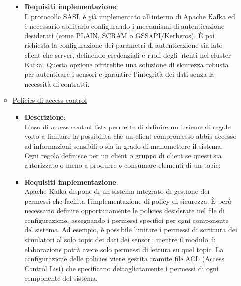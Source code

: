\documentclass[10pt]{article}
\begin{document}
\begin{itemize}
\begin{itemize}
\begin{itemize}
                    \item \textbf{Requisiti implementazione}:\\
                    Il protocollo SASL è già implementato all'interno di Apache Kafka ed è necessario abilitarlo configurando i meccanismi di autenticazione desiderati (come PLAIN, SCRAM o GSSAPI/Kerberos).
                    È poi richiesta la configurazione dei parametri di autenticazione sia lato client che server, definendo credenziali e ruoli degli utenti nel cluster Kafka.
                    Questa opzione offrirebbe una soluzione di sicurezza robusta per autenticare i sensori e garantire l'integrità dei dati senza la necessità di contratti.

                \end{itemize}

                \item \underline{Policies di access control}
                \begin{itemize}
                    \item \textbf{Descrizione}:\\
                    L'uso di access control lists permette di definire un insieme di regole volto a limitare la possibilità che un client compromesso abbia accesso ad informazioni sensibili o sia in grado di manomettere il sistema.
                    Ogni regola definisce per un client o gruppo di client se questi sia autorizzato o meno a produrre o consumare elementi di un topic;

                    \item \textbf{Requisiti implementazione}:\\
                    Apache Kafka dispone di un sistema integrato di gestione dei permessi che facilita l'implementazione di policy di sicurezza.
                    È però necessario definire opportunamente le policies desiderate nel file di configurazione, assegnando i permessi specifici per ogni componente del sistema.
                    Ad esempio, è possibile limitare i permessi di scrittura dei simulatori al solo topic dei dati dei sensori, mentre il modulo di elaborazione potrà avere solo permessi di lettura su quel topic.
                    La configurazione delle policies viene gestita tramite file ACL (Access Control List) che specificano dettagliatamente i permessi di ogni componente del sistema.


\end{itemize}
\end{itemize}
\end{itemize}
\end{document}

